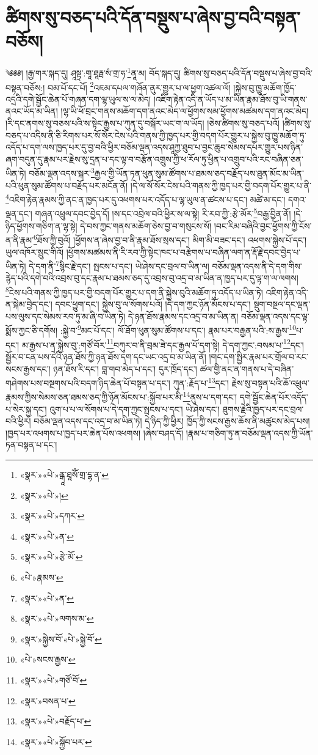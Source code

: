 \chapter{ཚིགས་སུ་བཅད་པའི་དོན་བསྡུས་པ་ཞེས་བྱ་བའི་བསྟན་བཅོས།}༄༅༅། །རྒྱ་གར་སྐད་དུ། ཤཱསྟྲ་:གཱ་ཐཱརྠ་སཾ་གྲ་ཧ་\footnote{«སྣར་»«པེ་»ནྒཱ་ཐཱསོཾ་གྲ་དྷ་ན་}ནཱ་མ། བོད་སྐད་དུ། ཚིགས་སུ་བཅད་པའི་དོན་བསྡུས་པ་ཞེས་བྱ་བའི་བསྟན་བཅོས:། བམ་པོ་དང་པོ། \footnote{«སྣར་»«པེ་»།  }འཇམ་དཔལ་གཞོན་ནུར་གྱུར་པ་ལ་ཕྱག་འཚལ་ལོ། །སྐྱེས་བུ་ཁྱུ་མཆོག་ཁྱོད་འདྲའི་དགེ་སྦྱོང་ཆེན་པོ་གཞན་དག་ལྷ་ཡུལ་ས་ལ་མེད། །འཇིག་རྟེན་འདི་ན་ཡོད་པ་མ་ཡིན་རྣམ་ཐོས་བུ་ཡི་གནས་ནའང་ཡོད་མ་ཡིན། །ལྷ་ཡི་ཕོ་བྲང་གནས་མཆོག་དག་ནའང་མེད་ལ་ཕྱོགས་སམ་ཕྱོགས་མཚམས་དག་ནའང་མེད། །རི་དང་ནགས་སུ་བཅས་པའི་ས་སྟེང་རྒྱས་པ་ཀུན་དུ་བསྐོར་ཡང་ག་ལ་ཡོད། །ཅེས་ཚིགས་སུ་བཅད་པའོ། །ཚིགས་སུ་བཅད་པ་འདིས་ནི་ཅི་རིགས་པར་སོ་སོར་ངེས་པའི་གནས་ཀྱི་ཁྱད་པར་གྱི་བདག་པོར་གྱུར་པ་སྐྱེས་བུ་ཁྱུ་མཆོག་ཏུ་འདོད་པ་དག་ལས་ཁྱད་པར་དུ་བྱ་བའི་ཕྱིར་བཅོམ་ལྡན་འདས་ཤཱཀྱ་ཐུབ་པ་བྱང་ཆུབ་སེམས་དཔར་གྱུར་པས་ཉིན་ཞག་བདུན་དུ་རྣམ་པར་རྗེས་སུ་དྲན་པ་དང་ལྟ་བ་བརྩོན་འགྲུས་ཀྱི་ཕ་རོལ་ཏུ་ཕྱིན་པ་འགྲུབ་པའི་རང་བཞིན་ཅན་ཡིན་ཏེ། བཅོམ་ལྡན་འདས་སྐར་\footnote{«སྣར་»«པེ་»དཀར་}རྒྱལ་གྱི་ཡོན་ཏན་ཕུན་སུམ་ཚོགས་པ་ཐམས་ཅད་བརྗོད་པས་ཐུན་མོང་མ་ཡིན་པའི་ཕུན་སུམ་ཚོགས་པ་བརྗོད་པར་མངོན་ནོ། །དེ་ལ་སོ་སོར་ངེས་པའི་གནས་ཀྱི་ཁྱད་པར་གྱི་བདག་པོར་གྱུར་པ་ནི་\footnote{«སྣར་»«པེ་»ན་}འཇིག་རྟེན་རྣམས་ཀྱི་ནང་ན་ཁྱད་པར་དུ་འཕགས་པར་འདོད་པ་ལྷ་ཡུལ་ན་ཚངས་པ་དང་། མཚེ་མ་དང་། དགའ་ལྡན་དང་། གཞན་འཕྲུལ་དབང་བྱེད་དོ། །ས་དང་འབྲེལ་བའི་ཕྱིར་ས་ལ་སྟེ། རི་རབ་ཀྱི་:རྩེ་མོར་\footnote{«སྣར་»«པེ་»རྩེ་མོ་}བརྒྱ་བྱིན་ནོ། །དེ་ཉིད་ཕྱོགས་གཅིག་ན་ལྷ་སྟེ། དེ་བས་ཀྱང་གནས་མཆོག་ཅེས་བྱ་བ་གསུངས་སོ། །བང་རིམ་བཞིའི་བྱང་ཕྱོགས་ཀྱི་ངོས་ན་ནི་རྣམ་\footnote{«པེ་»རྣམས་}ཐོས་ཀྱི་བུའོ། །ཕྱོགས་ན་ཞེས་བྱ་བ་ནི་རྣམ་ཐོས་སྲས་དང་། མིག་མི་བཟང་དང་། འཕགས་སྐྱེས་པོ་དང་། ཡུལ་འཁོར་སྲུང་གིའོ། །ཕྱོགས་མཚམས་ནི་རི་རབ་ཀྱི་སྟེང་ཁང་པ་བརྩེགས་པ་བཞིན་ལག་ན་རྡོ་རྗེ་དབང་བྱེད་པ་ཡིན་ཏེ། དེ་དག་ནི་\footnote{«སྣར་»«པེ་»ན་}སྙིང་རྗེ་དང་། སྤངས་པ་དང་། ཡེ་ཤེས་དང་བྲལ་བ་ཡིན་ལ། བཅོམ་ལྡན་འདས་ནི་དེ་དག་གིས་རྙེད་པའི་དགེ་བའི་འབྲས་བུ་དང་རྣམ་པ་ཐམས་ཅད་དུ་འབྲས་བུ་འདྲ་བ་མ་ཡིན་ན་ཁྱད་པར་དུ་ལྟ་ག་ལ་ལགས། \footnote{«སྣར་»«པེ་»ལགས་མ་}ངེས་པའི་གནས་ཀྱི་ཁྱད་པར་གྱི་བདག་པོར་གྱུར་པ་དག་ནི་སྐྱེས་བུའི་མཆོག་ཏུ་འདོད་པ་ཡིན་ཏེ། འཇིག་རྟེན་འདི་ན་སྐེམ་བྱེད་དང་། དབང་ཕྱུག་དང་། སྐྱེས་བུ་ལ་སོགས་པའོ། །དེ་དག་ཀྱང་ཉོན་མོངས་པ་དང་། སྡུག་བསྔལ་དང་ལྡན་པས་ལུས་དང་སེམས་རབ་ཏུ་མ་ཞི་བ་ཡིན་ཏེ། དེ་ཉན་ཐོས་རྣམས་དང་འདྲ་བ་མ་ཡིན་ན། བཅོམ་ལྡན་འདས་དང་ལྟ་སྨོས་ཀྱང་ཅི་དགོས། :སྐྱེ་བ་\footnote{«སྣར་»སྐྱེས་བོ་«པེ་»སྐྱེ་བོ་}མང་པོ་དང་། ལོ་ཐོག་ཕུན་སུམ་ཚོགས་པ་དང་། རྣམ་པར་བརྒྱན་པའི་:ས་རྒྱས་\footnote{«པེ་»སངས་རྒྱས་}པ་དང་། མ་རྒྱས་པ་ན་སྐྱེས་བུ་:གཙོ་བོར་\footnote{«སྣར་»«པེ་»གཙོ་བོ་}བཀུར་བ་ནི་བྲམ་ཟེ་དང་རྒྱལ་པོ་དག་སྟེ། དེ་དག་ཀྱང་:བསམ་པ་\footnote{«སྣར་»བསན་པ་}དང་། སྦྱོར་བ་ངན་པས་དེའི་ཉན་ཐོས་ཀྱི་ཉན་ཐོས་དག་དང་ཡང་འདྲ་བ་མ་ཡིན་ནོ། །གང་དག་སྤྱིར་རྣམ་པར་གྲོལ་བ་རང་སངས་རྒྱས་དང་། ཉན་ཐོས་རི་དང་། བླ་གབ་མེད་པ་དང་། དུར་ཁྲོད་དང་། ཚལ་གྱི་ནང་ན་གནས་པ་དེ་བཞིན་གཤེགས་པས་བསྔགས་པའི་བདག་ཉིད་ཆེན་པོ་བསྟན་པ་དང་། ཀུན་:རྗོད་པ་\footnote{«སྣར་»«པེ་»བརྗོད་པ་}དང་། རྗེས་སུ་བསྟན་པའི་ཆོ་འཕྲུལ་རྣམས་ཀྱིས་སེམས་ཅན་ཐམས་ཅད་ཀྱི་ཉོན་མོངས་པ་:སྐྱོབ་པར་མི་\footnote{«སྣར་»«པེ་»སྐྱོབ་པར་}ནུས་པ་དག་དང་། དགེ་སྦྱོང་ཆེན་པོར་འདོད་པ་སེར་སྐྱ་དང་། འུག་པ་པ་ལ་སོགས་པ་དེ་དག་ཀྱང་སྤངས་པ་དང་། ཡེ་ཤེས་དང་། ཐུགས་རྗེའི་ཁྱད་པར་དང་བྲལ་བའི་ཕྱིར། བཅོམ་ལྡན་འདས་དང་འདྲ་བ་མ་ཡིན་ཏེ། དེ་ཉིད་ཀྱི་ཕྱིར། ཁྱོད་ཀྱི་སངས་རྒྱས་ཆོས་ནི་མཚུངས་མེད་པས། །ཁྱད་པར་འཕགས་པ་ཁྱད་པར་ཆེན་པོས་འཕགས། །ཞེས་བཤད་དོ། །རྣམ་པ་གཅིག་ཏུ་ན་བཅོམ་ལྡན་འདས་ཀྱི་ཡོན་ཏན་བསྟན་པ་དང་། 